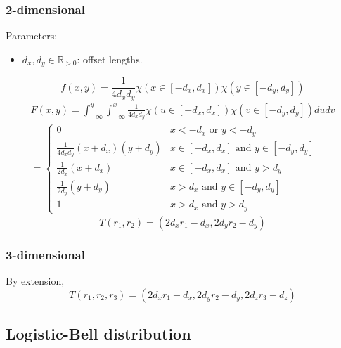 \documentclass[10pt]{report}
\begin{document}
\subsubsection{2-dimensional}
Parameters:
\begin{itemize}
\item $d_x,d_y\in\mathbb{R}_{>0}$: offset lengths.
\end{itemize}
\begin{equation}f(x,y)=\frac{1}{4d_xd_y}\chi(x\in[-d_x,d_x])\chi(y\in[-d_y,d_y])\end{equation}
\begin{multline}F(x,y)=\int_{-\infty}^y\int_{-\infty}^x\frac{1}{4d_xd_y}\chi(u\in[-d_x,d_x])\chi(v\in[-d_y,d_y])dudv\\=\begin{cases}
0&x<-d_x\mbox{ or }y<-d_y\\
\frac{1}{4d_xd_y}(x+d_x)(y+d_y)&x\in[-d_x,d_x]\mbox{ and }y\in[-d_y,d_y]\\
\frac{1}{2d_x}(x+d_x)&x\in[-d_x,d_x]\mbox{ and }y>d_y\\
\frac{1}{2d_y}(y+d_y)&x>d_x\mbox{ and }y\in[-d_y,d_y]\\
1&x>d_x\mbox{ and }y>d_y
\end{cases}\end{multline}
\begin{equation}T(r_1,r_2)=(2d_xr_1-d_x,2d_yr_2-d_y)\end{equation}
\subsubsection{3-dimensional}
By extension,
\begin{equation}T(r_1,r_2,r_3)=(2d_xr_1-d_x,2d_yr_2-d_y,2d_zr_3-d_z)\end{equation}

\subsection{Logistic-Bell distribution}
\end{document}
